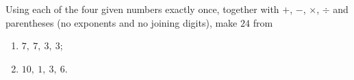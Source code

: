 Using each of the four given numbers exactly once, together with $+$, $-$, $\times$, $\div$ and parentheses (no exponents and no joining digits), make $24$ from
\begin{enumerate}
\item[(a)] $7,\ 7,\ 3,\ 3$;
\item[(b)] $10,\ 1,\ 3,\ 6$.
\end{enumerate}
